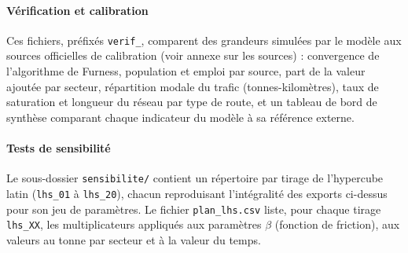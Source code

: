 \documentclass[12pt,a4paper,french]{report}
\begin{document}
		\paragraph{Vérification et calibration}
		Ces fichiers, préfixés \texttt{verif\_}, comparent des grandeurs simulées par le modèle aux sources officielles de calibration (voir annexe sur les sources) : convergence de l'algorithme de Furness, population et emploi par source, part de la valeur ajoutée par secteur, répartition modale du trafic (tonnes-kilomètres), taux de saturation et longueur du réseau par type de route, et un tableau de bord de synthèse comparant chaque indicateur du modèle à sa référence externe.

		\paragraph{Tests de sensibilité}
		Le sous-dossier \texttt{sensibilite/} contient un répertoire par tirage de l'hypercube latin (\texttt{lhs\_01} à \texttt{lhs\_20}), chacun reproduisant l'intégralité des exports ci-dessus pour son jeu de paramètres. Le fichier \texttt{plan\_lhs.csv} liste, pour chaque tirage \texttt{lhs\_XX}, les multiplicateurs appliqués aux paramètres $\beta$ (fonction de friction), aux valeurs au tonne par secteur et à la valeur du temps.
\end{document}
